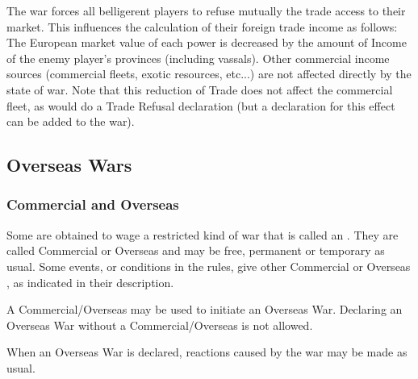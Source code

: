 The war forces all belligerent players to refuse mutually the trade access to
their market. This influences the calculation of their foreign trade income as
follows:
\bparag The European market value of each power is decreased by the amount of
Income of the enemy player's provinces (including vassals).
\bparag Other commercial income sources (commercial fleets, exotic resources,
etc...) are not affected directly by the state of war.
\bparag Note that this reduction of Trade does not affect the commercial
fleet, as would do a Trade Refusal declaration (but a declaration for this
effect can be added to the war).



\subsection{Overseas Wars}\label{chDiplo:Overseas Wars}


\subsubsection{Commercial and Overseas \CB}
\aparag Some \CB are obtained to wage a restricted kind of war that is called
an . They are called Commercial \CB or Overseas \CB and
may be free, permanent or temporary as usual. Some events, or conditions in
the rules, give other Commercial or Overseas \CB, as indicated in their
description.  \overseascb

\aparag A Commercial/Overseas \CB may be used to initiate an Overseas
War. Declaring an Overseas War without a Commercial/Overseas \CB is not
allowed.

\aparag When an Overseas War is declared, reactions caused by the war may be
made as usual.


